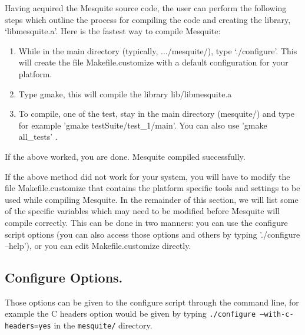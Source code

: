 \documentclass[letter]{report}
\begin{document}
Having acquired the Mesquite source code, the user can perform the
following steps which outline the process for compiling the code and
creating the library, `libmesquite.a'. Here is the fastest way to compile Mesquite:
\begin{enumerate}
\item While in the main directory (typically, .../mesquite/), type
`./configure'.  This will create the file Makefile.customize with a default configuration
for your platform.
\item Type gmake, this will compile the library lib/libmesquite.a
\item To compile, one of the test, stay in the main directory (mesquite/) and type 
for example 'gmake testSuite/test\_1/main'. You can also use 'gmake all\_tests' .
\end{enumerate}
If the above worked, you are done. Mesquite compiled successfully. 

If the above method did not work for your system, you will have to modify the file
Makefile.customize that contains the platform specific tools and settings to be used 
while compiling Mesquite. In the remainder of this section, we
will  list some of the specific variables which
may need to be modified before Mesquite will compile correctly.
This can be done in two manners: you can use the configure
script options (you can also access those options and
others by typing './configure --help'), or you can edit
Makefile.customize directly.

\subsection{Configure Options.}  \label{config_options}

Those options can be given to the configure script through the command line, for example the C headers
option would be given by typing \texttt{./configure --with-c-headers=yes} in the \texttt{mesquite/} directory.
\end{document}
